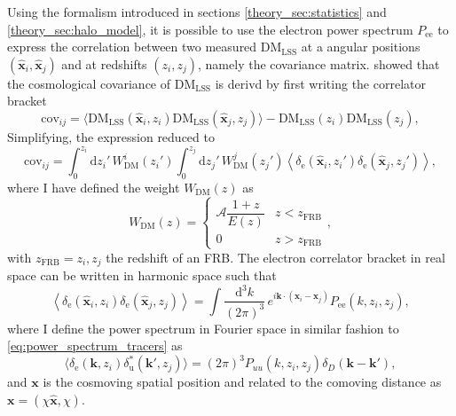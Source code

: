 Using the formalism introduced in sections \ref{theory_sec:statistics} and \ref{theory_sec:halo_model}, it is possible to use the electron power spectrum $P_{\mathrm{ee}}$ to express the correlation between two measured $\mathrm{DM}_\mathrm{LSS}$ at a angular positions $\left(\mathbf{\hat{x}}_i, \mathbf{\hat{x}}_j\right)$ and at redshifts $(z_i, z_j)$, namely the covariance matrix. \citep{10.1093/mnras/stad1645} showed that the cosmological covariance of  $\mathrm{DM}_\mathrm{LSS}$ is derivd by first writing the correlator bracket 
\begin{equation}
    \mathrm{cov}_{ij} = \langle\mathrm{DM}_\mathrm{LSS}(\mathbf{\hat{x}}_i, z_i) \mathrm{DM}_\mathrm{LSS}(\mathbf{\hat{x}}_j, z_j)\rangle - \mathrm{DM}_\mathrm{LSS}(z_i) \mathrm{DM}_\mathrm{LSS}(z_j),
\end{equation}
Simplifying, the expression reduced to
\begin{equation}
    \mathrm{cov}_{ij} = \int_0^{z_i} \mathrm{d}z_i' \, W_{\mathrm{DM}}^i(z_i') \int_0^{z_j} \mathrm{d}z_j' \, W_{\mathrm{DM}}^j(z_j') \left\langle \delta_{\mathrm{e}}(\mathbf{\hat{x}}_i, z_i') \delta_{\mathrm{e}}(\mathbf{\hat{x}}_j, z_j') \right\rangle,
\end{equation}
where I have defined the weight $W_{\mathrm{DM}}(z)$ as
\begin{equation}
    W_{\mathrm{DM}}(z) = \begin{cases} \mathcal{A} \dfrac{1+z}{E(z)} & z < z_{\mathrm{FRB}} \\ 0 & z > z_{\mathrm{FRB}} \end{cases},
\end{equation}
with $z_\mathrm{FRB} = z_i, z_j$ the redshift of an FRB. The electron correlator bracket in real space can be written in harmonic space such that
\begin{equation} \label{eq:e_fourier}
    \left\langle \delta_{\mathrm{e}}(\mathbf{\hat{x}}_i, z_i) \delta_{\mathrm{e}}(\mathbf{\hat{x}}_j, z_j) \right\rangle = \int \frac{\mathrm{d}^3k}{(2\pi)^3} \, e^{i\mathbf{k} \cdot (\mathbf{x}_i - \mathbf{x}_j)} P_{\mathrm{ee}}(k, z_i, z_j),
\end{equation}
where I define the power spectrum in Fourier space in similar fashion to \ref{eq:power_spectrum_tracers} as
\begin{equation}
    \langle \delta_\mathrm{e}(\mathbf{k}, z_i) \delta_\mathrm{u}^*(\mathbf{k}', z_j) \rangle = (2\pi)^3 P_{uu}(k, z_i, z_j) \delta_D(\mathbf{k} - \mathbf{k}'),
\end{equation}
and $\mathbf{x}$ is the cosmoving spatial position and related to the comoving distance as $\mathbf{x} = (\chi \mathbf{\hat{x}}, \chi)$.


